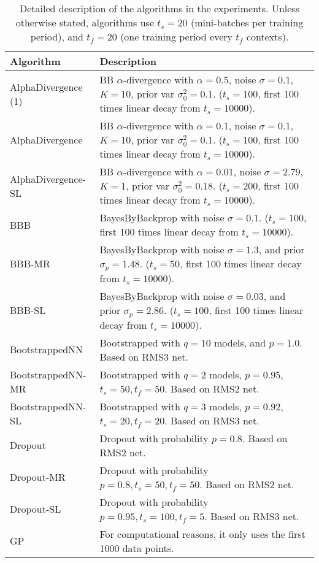 \documentclass{article} \usepackage{iclr2018_conference,times}
\begin{document}
\begin{table}[ht]
  \caption{Detailed description of the algorithms in the experiments. Unless otherwise stated, algorithms use $t_s = 20$ (mini-batches per training period), and $t_f = 20$ (one training period every $t_f$ contexts).}
  \label{tab:algo_description_main}
  \centering
  \footnotesize
  \tiny
\begin{adjustbox}{center}
  \begin{tabular}{ll}
  Algorithm  & Description \\
    \midrule
AlphaDivergence (1) & BB $\alpha$-divergence with $\alpha = 0.5$, noise $\sigma = 0.1$, $K=10$, prior var $\sigma_0^2 = 0.1$. ($t_s = 100$, first 100 times linear decay from $t_s = 10000$).  \\
AlphaDivergence & BB $\alpha$-divergence with $\alpha = 0.1$, noise $\sigma = 0.1$, $K=10$, prior var $\sigma_0^2 = 0.1$. ($t_s = 100$, first 100 times linear decay from $t_s = 10000$). \\
AlphaDivergence-SL & BB $\alpha$-divergence with $\alpha = 0.01$, noise $\sigma = 2.79$, $K=1$, prior var $\sigma_0^2 = 0.18$. ($t_s = 200$, first 100 times linear decay from $t_s = 10000$).  \\
BBB & BayesByBackprop with noise $\sigma = 0.1$. ($t_s = 100$, first 100 times linear decay from $t_s = 10000$). \\
BBB-MR & BayesByBackprop with noise $\sigma = 1.3$, and prior $\sigma_p = 1.48$. ($t_s = 50$, first 100 times linear decay from $t_s = 10000$). \\
BBB-SL & BayesByBackprop with noise $\sigma = 0.03$, and prior $\sigma_p = 2.86$. ($t_s = 100$, first 100 times linear decay from $t_s = 10000$). \\
BootstrappedNN & Bootstrapped with $q = 10$ models, and $p = 1.0$. Based on RMS3 net. \\
BootstrappedNN-MR & Bootstrapped with $q = 2$ models, $p = 0.95$, $t_s = 50, t_f = 50$. Based on RMS2 net. \\
BootstrappedNN-SL & Bootstrapped with $q = 3$ models, $p = 0.92$, $t_s = 20, t_f = 20$. Based on RMS3 net. \\
Dropout & Dropout with probability $p = 0.8$. Based on RMS2 net. \\
Dropout-MR & Dropout with probability $p = 0.8, t_s = 50, t_f = 50$. Based on RMS2 net. \\
Dropout-SL & Dropout with probability $p = 0.95, t_s = 100, t_f = 5$. Based on RMS3 net. \\
GP & For computational reasons, it only uses the first 1000 data points. \\

\end{tabular}
\end{adjustbox}
\end{table}
\end{document}
